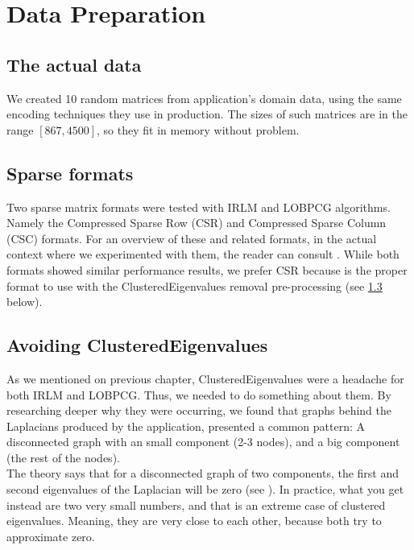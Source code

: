 \section{Data Preparation}

\subsection{The actual data}
We created 10 random matrices from application's domain data, using
the same encoding techniques they use in production. The sizes of such
matrices are in the range $[867,4500]$, so they fit in memory without
problem. \\

\subsection{Sparse formats}
Two sparse matrix formats were tested with \gls{IRLM} and
\gls{LOBPCG} 
algorithms. Namely the Compressed Sparse Row (CSR) and Compressed
Sparse Column (CSC) formats. For an overview of these and related
formats, in the actual context where we experimented with them, the
reader can consult \cite{johansson15}. While both formats showed
similar performance results, we prefer CSR because is the proper
format to use with the \gls{ClusteredEigenvalues} removal pre-processing (see
\cref{sub:avoid-clust-eigv} below). 

\subsection{Avoiding \gls{ClusteredEigenvalues}}
\label{sub:avoid-clust-eigv}

As we mentioned on previous chapter, \gls{ClusteredEigenvalues} were a
headache for both \gls{IRLM} and \gls{LOBPCG}. Thus, we needed to do something
about them. By researching deeper why they were occurring, we found
that graphs behind the \gls{Laplacian}s produced by the
application, presented a common pattern: A disconnected graph with an
small component (2-3 nodes), and a big component (the rest of the
nodes). \\

The theory says that for a disconnected graph of two components, the
first and second eigenvalues of the \gls{Laplacian} will be zero (see
\cite{luxburg07}). In practice, what you get instead are two very
small numbers, and that is an extreme case of clustered
eigenvalues. Meaning, they are very close to each other, because both try to
approximate zero. \\

